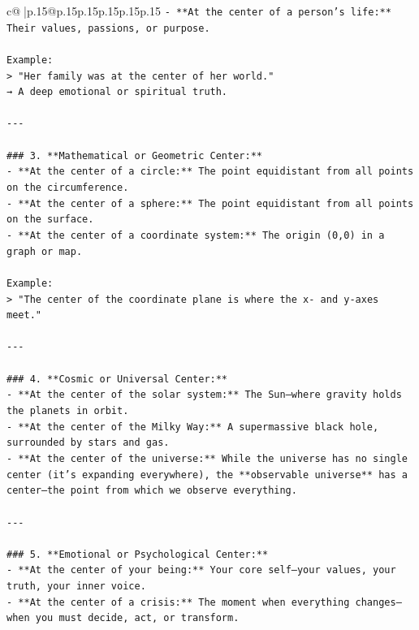 \documentclass{article}
\begin{document}
{\begin{supertabular}{c@{$\;$}|p{.15\linewidth}@{}p{.15\linewidth}p{.15\linewidth}p{.15\linewidth}p{.15\linewidth}p{.15\linewidth}}
{{{\texttt{{-} **At the center of a person’s life:** Their values, passions, or purpose.} \\
\\ 
\texttt{Example:  } \\
\texttt{> "Her family was at the center of her world."  } \\
\texttt{→ A deep emotional or spiritual truth.} \\
\\ 
\texttt{{-}{-}{-}} \\
\\ 
\texttt{\#\#\# 3. **Mathematical or Geometric Center:**} \\
\texttt{{-} **At the center of a circle:** The point equidistant from all points on the circumference.} \\
\texttt{{-} **At the center of a sphere:** The point equidistant from all points on the surface.} \\
\texttt{{-} **At the center of a coordinate system:** The origin (0,0) in a graph or map.} \\
\\ 
\texttt{Example:  } \\
\texttt{> "The center of the coordinate plane is where the x{-} and y{-}axes meet."} \\
\\ 
\texttt{{-}{-}{-}} \\
\\ 
\texttt{\#\#\# 4. **Cosmic or Universal Center:**} \\
\texttt{{-} **At the center of the solar system:** The Sun—where gravity holds the planets in orbit.} \\
\texttt{{-} **At the center of the Milky Way:** A supermassive black hole, surrounded by stars and gas.} \\
\texttt{{-} **At the center of the universe:** While the universe has no single center (it’s expanding everywhere), the **observable universe** has a center—the point from which we observe everything.} \\
\\ 
\texttt{{-}{-}{-}} \\
\\ 
\texttt{\#\#\# 5. **Emotional or Psychological Center:**} \\
\texttt{{-} **At the center of your being:** Your core self—your values, your truth, your inner voice.} \\
\texttt{{-} **At the center of a crisis:** The moment when everything changes—when you must decide, act, or transform.} \\
}}}
\end{supertabular}}
\end{document}
